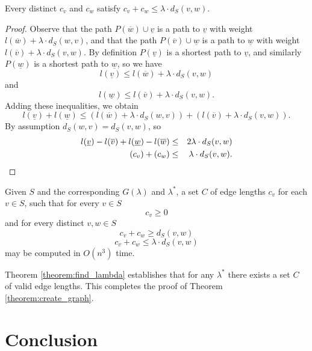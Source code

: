 \documentclass{llncs}
\begin{document}
\begin{lemma}
Every distinct $c_v$ and $c_w$ satisfy $c_v + c_w \leq \lambda \cdot d_S(v,w).$
\end{lemma}

\begin{proof}
Observe that the path $P(\overline{w}) \cup \underline{v}$ is a path to $\underline{v}$ with weight $l(\overline{w})+\lambda \cdot d_S(w,v)$, and that the path $P(\overline{v}) \cup \underline{w}$ is a path to $\underline{w}$ with weight $l(\overline{v})+\lambda \cdot d_S(v,w)$.  By definition $P(\underline{v})$ is a shortest path to $\underline{v}$, and similarly $P(\underline{w})$ is a shortest path to $\underline{w}$, so we have
\[ l(\underline{v}) \leq l(\overline{w}) + \lambda \cdot d_S(v,w) \]
\noindent and
\[ l(\underline{w}) \leq l(\overline{v}) + \lambda \cdot d_S(v,w) .\]
\noindent Adding these inequalities, we obtain
\[ l(\underline{v}) + l(\underline{w}) \leq \left(l(\overline{w}) + \lambda \cdot d_S(w,v)\right) + \left(l(\overline{v}) + \lambda \cdot d_S(v,w)\right) .\]
\noindent By assumption $d_S(w,v)=d_S(v,w)$, so
\begin{eqnarray*}
l(\underline{v}) - l(\overline{v}) + l(\underline{w}) - l(\overline{w}) &\leq& 2 \lambda \cdot d_S(v,w) \\
\omit{\frac{l(\underline{v}) - l(\overline{v})}{2} + \frac{l(\underline{w}) - l(\overline{w})}{2} &\leq& \lambda \cdot d_S(v,w) \\}
(c_v) + (c_w) &\leq& \lambda \cdot d_S(v,w) .
\end{eqnarray*}
\end{proof}


\begin{theorem}
\label{theorem:find_lambda}
Given $S$ and the corresponding $G(\lambda)$ and $\lambda^*$, a set $C$ of edge lengths $c_v$ for each $v \in S$,  such that for every $v \in S$
\[ c_v \geq 0 \]
\noindent and for every distinct $v,w \in S$
\[ c_v + c_w \geq d_S(v,w) \]
\[ c_v + c_w \leq \lambda \cdot d_S(v,w) \]
\noindent may be computed in $O(n^3)$ time.
\end{theorem}

Theorem \ref{theorem:find_lambda} establishes that for any $\lambda^*$ there exists a set $C$ of valid edge lengths.  This completes the proof of Theorem \ref{theorem:create_graph}.

\section{Conclusion}
\label{section:conclusion}
\end{document}
